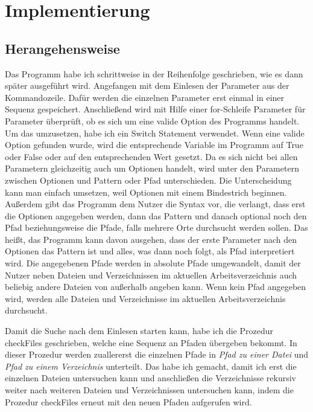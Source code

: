\documentclass[11pt]{report}
\begin{document}
\chapter{Implementierung}
\section{Herangehensweise}
Das Programm habe ich schrittweise in der Reihenfolge geschrieben, wie es dann später ausgeführt wird. Angefangen mit dem Einlesen der Parameter aus der Kommandozeile. Dafür werden die einzelnen Parameter erst einmal in einer Sequenz gespeichert. Anschließend wird mit Hilfe einer for-Schleife Parameter für Parameter überprüft, ob es sich um eine valide Option des Programms handelt. Um das umzusetzen, habe ich ein Switch Statement verwendet. Wenn eine valide Option gefunden wurde, wird die entsprechende Variable im Programm auf True oder False oder auf den entsprechenden Wert gesetzt. Da es sich nicht bei allen Parametern gleichzeitig auch um Optionen handelt, wird unter den Parametern zwischen Optionen und Pattern oder Pfad unterschieden. Die Unterscheidung kann man einfach umsetzen, weil Optionen mit einem Bindestrich beginnen. Außerdem gibt das Programm dem Nutzer die Syntax vor, die verlangt, dass erst die Optionen angegeben werden, dann das Pattern und danach optional noch den Pfad beziehungsweise die Pfade, falls mehrere Orte durchsucht werden sollen.
Das heißt, das Programm kann davon ausgehen, dass der erste Parameter nach den Optionen das Pattern ist und alles, was dann noch folgt, als Pfad interpretiert wird. Die angegebenen Pfade werden in absolute Pfade umgewandelt, damit der Nutzer neben Dateien und Verzeichnissen im aktuellen Arbeitsverzeichnis auch beliebig andere Dateien von außerhalb angeben kann. Wenn kein Pfad angegeben wird, werden alle Dateien und Verzeichnisse im aktuellen Arbeitsverzeichnis durchsucht.

Damit die Suche nach dem Einlesen starten kann, habe ich die Prozedur checkFiles geschrieben, welche eine Sequenz an Pfaden übergeben bekommt. In dieser Prozedur werden zuallererst die einzelnen Pfade in \emph{Pfad zu einer Datei} und \emph{Pfad zu einem Verzeichnis} unterteilt. Das habe ich gemacht, damit ich erst die einzelnen Dateien untersuchen kann und anschließen die Verzeichnisse rekursiv weiter nach weiteren Dateien und Verzeichnissen untersuchen kann, indem die Prozedur checkFiles erneut mit den neuen Pfaden aufgerufen wird.
\end{document}
